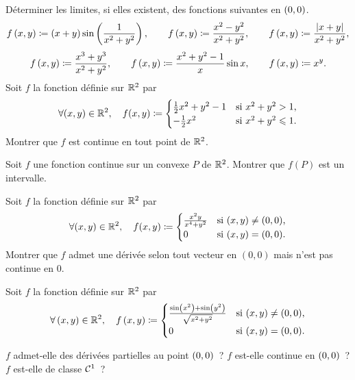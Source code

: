 \documentclass{magnolia}
\begin{document}
Déterminer les limites, si elles existent, des fonctions suivantes en $\left(0,0\right)$.
\[f\left(x,y\right)\coloneqq\left(x+y\right)\sin\left(\frac{1}{x^2+y^2}\right), \qquad
  f\left(x,y\right)\coloneqq\frac{x^2-y^2}{x^2+y^2}, \qquad
  f\left(x,y\right)\coloneqq\frac{\left|x+y\right|}{x^2+y^2},\]
\[f\left(x,y\right)\coloneqq\frac{x^3+y^3}{x^2+y^2}, \qquad
  f\left(x,y\right)\coloneqq\frac{x^2+y^2-1}{x}\sin x, \qquad
  f\left(x,y\right)\coloneqq x^y.\]
Soit $f$ la fonction définie sur $\mathbb{R}^2$ par
\[\forall (x,y)\in\mathbb{R}^2 ,\quad f(x,y)\coloneqq
  \begin{cases}
  \frac{1}{2}x^2+y^2-1 & \text{si $x^2+y^2>1$,}\\
  -\frac{1}{2}x^2 & \text{si $x^2+y^2\leqslant 1$.}
  \end{cases}
\]
Montrer que $f$ est continue en tout point de $\mathbb{R}^2$.

Soit $f$ une fonction continue sur un convexe $P$ de $\mathbb{R}^2$. Montrer que $f(P)$
est un intervalle.







Soit $f$ la fonction définie sur $\mathbb{R}^2$ par
\[\forall (x,y)\in\mathbb{R}^2 ,\quad f(x,y)\coloneqq
  \begin{cases}
  \frac{x^2y}{x^4+y^2} & \text{si $(x,y)\not=(0,0)$,}\\
  0                    & \text{si $(x,y)=(0,0)$.}  
  \end{cases}\]
Montrer que $f$ admet une dérivée selon tout vecteur en $(0,0)$ mais n'est pas
continue en $0$.

Soit $f$ la fonction définie sur $\mathbb{R}^2$ par
\[\forall\left(x,y\right)\in\mathbb{R}^2 ,\quad
  f\left(x,y\right)\coloneqq
  \begin{cases}
  \frac{\sin\left(x^2\right)+\sin\left(y^2\right)}{\sqrt{x^2+y^2}} &
    \text{si $\left(x,y\right)\neq\left(0,0\right)$,}\\
  0 &  \text{si $\left(x,y\right)=\left(0,0\right)$.}
  \end{cases}\]
\begin{questions}
\question $f$ admet-elle des dérivées partielles au point $\left(0,0\right)$~?
\question $f$ est-elle continue en $\left(0,0\right)$~?
\question $f$ est-elle de classe $\mathcal{C}^{1}$~?   
\end{questions}
\end{document}
